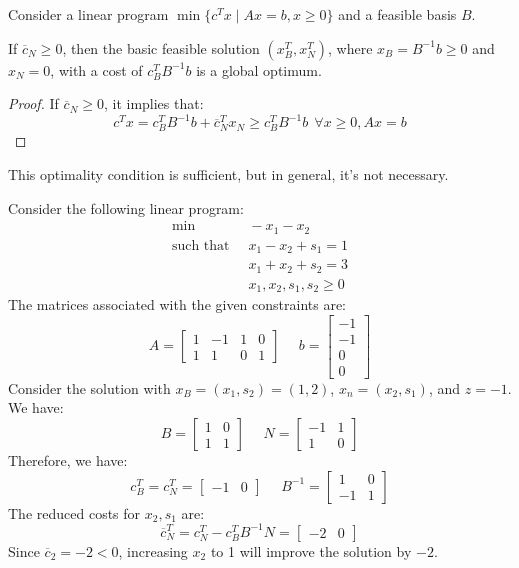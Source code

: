 Consider a linear program $\min\{c^Tx\mid Ax=b,x\geq 0\}$ and a feasible basis $B$. 
\begin{proposition}
    If $\overline{c}_N \geq 0$, then the basic feasible solution $(x_B^T,x_N^T)$, where $x_B=B^{-1}b \geq 0$ and $x_N = 0$, with a cost of  $c_B^TB^{-1}b$ is a global optimum. 
\end{proposition}
\begin{proof}
    If $\overline{c}_N \geq 0$, it implies that: 
    \[c^Tx=c_B^TB^{-1}b+\overline{c}_N^Tx_N \geq c_B^TB^{-1}b \:\: \forall x \geq 0, Ax=b\]
\end{proof}
This optimality condition is sufficient, but in general, it's not necessary.
\begin{example}
    Consider the following linear program: 
    \begin{align*}
        \min                      \:&\: -x_1-x_2          \\
        \text{such that }     &\: x_1-x_2+s_1=1  \\
                                    &\: x_1+x_2+s_2=3  \\
                                    &\: x_1,x_2,s_1,s_2 \geq 0
    \end{align*}
    The matrices associated with the given constraints are:
    \[
    A=
    \begin{bmatrix}
        1 & -1 & 1 & 0  \\
        1 & 1 & 0 & 1 
    \end{bmatrix}
    \:\:\:\:\:\:
    b=
    \begin{bmatrix}
        -1 \\
        -1 \\
        0  \\
        0
    \end{bmatrix}
    \]
    Consider the solution with $x_B=(x_1,s_2)=(1,2)$, $x_n=(x_2,s_1)$, and $z=-1$. 
    We have:
    \[
    B=
    \begin{bmatrix}
        1 & 0  \\
        1 & 1  
    \end{bmatrix}
    \:\:\:\:\:\:
    N=
    \begin{bmatrix}
        -1 & 1  \\
        1  & 0  
    \end{bmatrix}
    \]
    Therefore, we have:
    \[c_B^T=c_N^T=\begin{bmatrix} -1 & 0 \end{bmatrix} \:\:\:\:\:\: B^{-1}=
    \begin{bmatrix}
        1  & 0  \\
        -1 & 1  
    \end{bmatrix}
    \]
    The reduced costs for $x_2,s_1$ are: 
    \[\overline{c}_N^T=c_N^T-c_B^TB^{-1}N=\begin{bmatrix} -2 & 0 \end{bmatrix}\]
    Since $\overline{c}_2=-2<0$, increasing $x_2$ to 1 will improve the solution by $-2$. 
\end{example}

